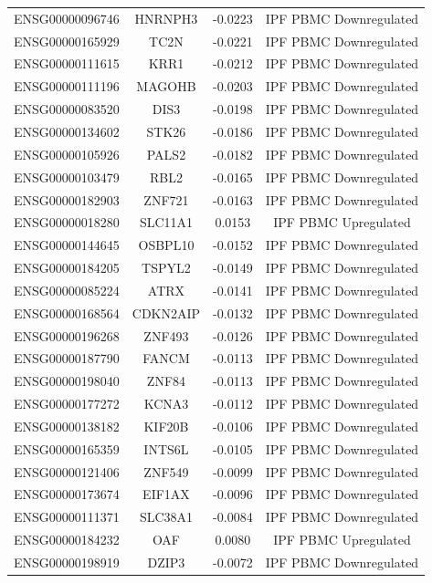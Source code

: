 \documentclass[
]{article}
\begin{document}
\begin{singlespace}
\begin{longtable}[t]{lccc}
ENSG00000096746 & HNRNPH3 & -0.0223 & IPF PBMC Downregulated\\
ENSG00000165929 & TC2N & -0.0221 & IPF PBMC Downregulated\\
ENSG00000111615 & KRR1 & -0.0212 & IPF PBMC Downregulated\\
\addlinespace
ENSG00000111196 & MAGOHB & -0.0203 & IPF PBMC Downregulated\\
ENSG00000083520 & DIS3 & -0.0198 & IPF PBMC Downregulated\\
ENSG00000134602 & STK26 & -0.0186 & IPF PBMC Downregulated\\
ENSG00000105926 & PALS2 & -0.0182 & IPF PBMC Downregulated\\
ENSG00000103479 & RBL2 & -0.0165 & IPF PBMC Downregulated\\
\addlinespace
ENSG00000182903 & ZNF721 & -0.0163 & IPF PBMC Downregulated\\
ENSG00000018280 & SLC11A1 & 0.0153 & IPF PBMC Upregulated\\
ENSG00000144645 & OSBPL10 & -0.0152 & IPF PBMC Downregulated\\
ENSG00000184205 & TSPYL2 & -0.0149 & IPF PBMC Downregulated\\
ENSG00000085224 & ATRX & -0.0141 & IPF PBMC Downregulated\\
\addlinespace
ENSG00000168564 & CDKN2AIP & -0.0132 & IPF PBMC Downregulated\\
ENSG00000196268 & ZNF493 & -0.0126 & IPF PBMC Downregulated\\
ENSG00000187790 & FANCM & -0.0113 & IPF PBMC Downregulated\\
ENSG00000198040 & ZNF84 & -0.0113 & IPF PBMC Downregulated\\
ENSG00000177272 & KCNA3 & -0.0112 & IPF PBMC Downregulated\\
\addlinespace
ENSG00000138182 & KIF20B & -0.0106 & IPF PBMC Downregulated\\
ENSG00000165359 & INTS6L & -0.0105 & IPF PBMC Downregulated\\
ENSG00000121406 & ZNF549 & -0.0099 & IPF PBMC Downregulated\\
ENSG00000173674 & EIF1AX & -0.0096 & IPF PBMC Downregulated\\
ENSG00000111371 & SLC38A1 & -0.0084 & IPF PBMC Downregulated\\
\addlinespace
ENSG00000184232 & OAF & 0.0080 & IPF PBMC Upregulated\\
ENSG00000198919 & DZIP3 & -0.0072 & IPF PBMC Downregulated\\

\end{longtable}
\end{singlespace}
\end{document}
